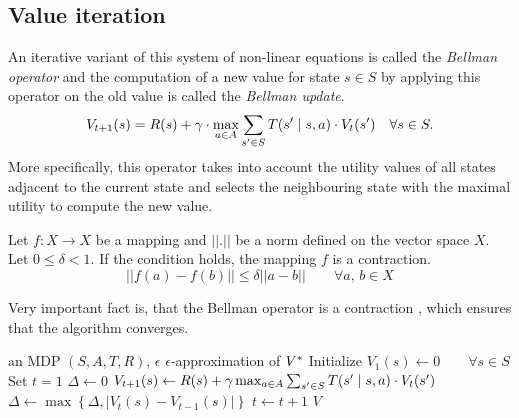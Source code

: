 \documentclass[../main.tex]{subfiles}
\begin{document}
\subsection{Value iteration}\label{standard:mdp:valueiter}
An iterative variant of this system of non-linear equations is called the \textit{Bellman operator} and the computation of a new value for state $s \in S$ by applying this operator on the old value is called the \textit{Bellman update}.
\begin{equation}\label{standard:mdp:bellmanup}
    V_{t+1}(s) = R(s) + \gamma \cdot \max_{a \in A} \sum_{\news \in S} T(\news \mid s, a) \cdot V_{t}(\news) \quad \forall s \in S.
\end{equation}
More specifically, this operator takes into account the utility values of all states adjacent to the current state and selects the neighbouring state with the maximal utility to compute the new value.
\begin{definition}\label{standard:mdp:valueiter:contraction}
    Let $f: X \to X$ be a mapping and $||.||$ be a norm defined on the vector space $X$.
    Let $0 \leq \delta < 1$.
    If the condition  holds, the mapping $f$ is a contraction.
    \begin{equation}\label{standard:mdp:valueiter:contraction:formula}
        ||f(a) - f(b)|| \leq \delta ||a - b|| \qquad \forall a,\,b \in X
    \end{equation}
\end{definition}
Very important fact is, that the Bellman operator is a contraction , which ensures that the algorithm converges.

\begin{algorithm}
    \caption{Value iteration for MDPs}
    \label{standard:mdp:valueiter:alg}
    \begin{algorithmic}[1]
        \Require an MDP $\left(S, A, T, R\right)$, $\epsilon$
        \Ensure $\epsilon$-approximation of $\vstar$
        \State Initialize $V_1(s) \leftarrow 0 \qquad \forall s \in S$
        \State Set $t = 1$
        \Repeat
            \State $\Delta \leftarrow 0$
                \State $V_{t + 1}(s) \leftarrow R(s) + \gamma \max_{a \in A}\sum_{\news \in S}T(\news \mid s, a) \cdot V_{t}(\news)$
                \State $\Delta \leftarrow \max\left\{\Delta, |V_{t}(s) - V_{t - 1}(s)|\right\}$
            \EndFor
            \State $t \leftarrow t + 1$
        \Until{$\Delta \leq \epsilon$}
        \State\Return $V$
    \end{algorithmic}
\end{algorithm}
\end{document}
